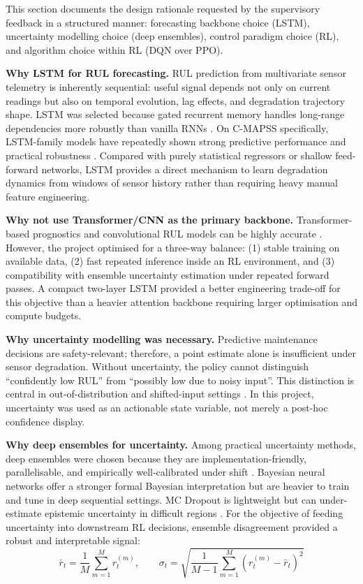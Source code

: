 \documentclass[12pt,a4paper]{report}
\begin{document}
This section documents the design rationale requested by the supervisory feedback in a structured manner: forecasting backbone choice (LSTM), uncertainty modelling choice (deep ensembles), control paradigm choice (RL), and algorithm choice within RL (DQN over PPO).

\textbf{Why LSTM for RUL forecasting.} RUL prediction from multivariate sensor telemetry is inherently sequential: useful signal depends not only on current readings but also on temporal evolution, lag effects, and degradation trajectory shape. LSTM was selected because gated recurrent memory handles long-range dependencies more robustly than vanilla RNNs \citep{hochreiter1997long}. On C-MAPSS specifically, LSTM-family models have repeatedly shown strong predictive performance and practical robustness \citep{zheng2017long, wu2018remaining, li2018remaining}. Compared with purely statistical regressors or shallow feed-forward networks, LSTM provides a direct mechanism to learn degradation dynamics from windows of sensor history rather than requiring heavy manual feature engineering.


\textbf{Why not use Transformer/CNN as the primary backbone.} Transformer-based prognostics and convolutional RUL models can be highly accurate \citep{li2018remaining, zhang2022transformer}. However, the project optimised for a three-way balance: (1) stable training on available data, (2) fast repeated inference inside an RL environment, and (3) compatibility with ensemble uncertainty estimation under repeated forward passes. A compact two-layer LSTM provided a better engineering trade-off for this objective than a heavier attention backbone requiring larger optimisation and compute budgets.


\textbf{Why uncertainty modelling was necessary.} Predictive maintenance decisions are safety-relevant; therefore, a point estimate alone is insufficient under sensor degradation. Without uncertainty, the policy cannot distinguish ``confidently low RUL'' from ``possibly low due to noisy input''. This distinction is central in out-of-distribution and shifted-input settings \citep{der2009aleatory, ovadia2019can}. In this project, uncertainty was used as an actionable state variable, not merely a post-hoc confidence display.


\textbf{Why deep ensembles for uncertainty.} Among practical uncertainty methods, deep ensembles were chosen because they are implementation-friendly, parallelisable, and empirically well-calibrated under shift \citep{lakshminarayanan2017simple, ovadia2019can}. Bayesian neural networks offer a stronger formal Bayesian interpretation but are heavier to train and tune in deep sequential settings. MC Dropout is lightweight but can under-estimate epistemic uncertainty in difficult regions \citep{gal2016dropout, osband2016risk}. For the objective of feeding uncertainty into downstream RL decisions, ensemble disagreement provided a robust and interpretable signal:
\begin{equation}
\bar{r}_t = \frac{1}{M}\sum_{m=1}^{M} r_t^{(m)}, \qquad
\sigma_t = \sqrt{\frac{1}{M-1}\sum_{m=1}^{M}\left(r_t^{(m)}-\bar{r}_t\right)^2}
\end{equation}
\end{document}
